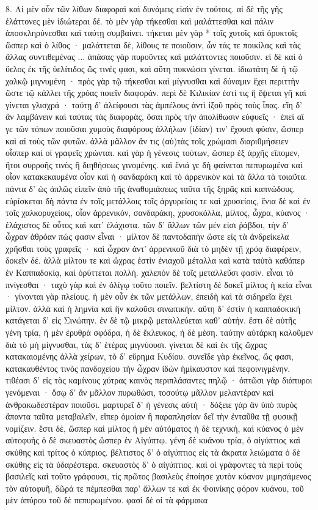 \documentclass[a4paper, 11pt, oneside, polutonikogreek, german]{article}
\begin{document}
8. Αἱ μὲν οὖν τῶν λίθων διαφοραὶ καὶ δυνάμεις εἰσὶν ἐν τούτοις. αἱ δὲ τῆς γῆς ἐλάττονες μὲν ἰδιώτεραι δέ. τὸ μὲν γὰρ τήκεσθαι καὶ μαλάττεσθαι καὶ πάλιν ἀποσκληρύνεσθαι καὶ ταύτῃ συμβαίνει. τήκεται μὲν γὰρ * τοῖς χυτοῖς καὶ ὀρυκτοῖς ὥσπερ καὶ ὁ λίθος · μαλάττεται δὲ, λίθους τε ποιοῦσιν, ὧν τάς τε ποικίλας καὶ τὰς ἄλλας συντιθεμένας ... ἁπάσας γὰρ πυροῦντες καὶ μαλάττοντες ποιοῦσιν. εἰ δὲ καὶ ὁ ὕελος ἐκ τῆς ὑελίτιδος ὥς τινές φασι, καὶ αὕτη πυκνώσει γίνεται. ἰδιωτάτη δὲ ἡ τῷ χαλκῷ μιγνυμένη · πρὸς γὰρ τῷ τήκεσθαι καὶ μίγνυσθαι καὶ δύναμιν ἔχει περιττὴν ὥστε τῷ κάλλει τῆς χρόας ποιεῖν διαφοράν. περὶ δὲ Κιλικίαν ἐστί τις ἣ ἕψεται γῆ καὶ γίνεται γλισχρά · ταύτῃ δ' ἀλείφουσι τὰς ἀμπέλους ἀντὶ ἰξοῦ πρὸς τοὺς ἶπας. εἴη δ' ἂν λαμβάνειν καὶ ταύτας τὰς διαφορὰς, ὅσαι πρὸς τὴν ἀπολίθωσιν εὐφυεῖς · ἐπεὶ αἵ γε τῶν τόπων ποιοῦσαι χυμοὺς διαφόρους ἀλλήλων (ἰδίαν) τιν' ἔχουσι φύσιν, ὥσπερ καὶ αἱ τοὺς τῶν φυτῶν. ἀλλὰ μᾶλλον ἄν τις (αὐ)τὰς τοῖς χρώμασι διαριθμήσειεν οἷσπερ καὶ οἱ γραφεῖς χρώνται. καὶ γὰρ ἡ γένεσις τούτων, ὥσπερ ἐξ ἀρχῆς εἴπομεν, ἤτοι συρροῆς τινὸς ἢ διηθήσεως γινομένης. καὶ ἔνιά γε δὴ φαίνεται πεπυρωμένα καὶ οἷον κατακεκαυμένα οἷον καὶ ἡ σανδαράκη καὶ τὸ ἀρρενικὸν καὶ τὰ ἄλλα τὰ τοιαῦτα. πάντα δ' ὡς ἁπλῶς εἰπεῖν ἀπὸ τῆς ἀναθυμιάσεως ταῦτα τῆς ξηρᾶς καὶ καπνώδους. εὑρίσκεται δὴ πάντα ἐν τοῖς μετάλλοις τοῖς ἀργυρείοις τε καὶ χρυσείοις, ἔνια δὲ καὶ ἐν τοῖς χαλκορυχείοις, οἷον ἀρρενικὸν, σανδαράκη, χρυσοκόλλα, μίλτος, ὦχρα, κύανος · ἐλάχιστος δὲ οὗτος καὶ κατ' ἐλάχιστα. τῶν δ' ἄλλων τῶν μέν εἰσι ῥάβδοι, τὴν δ' ὦχραν ἀθρόαν πώς φασιν εἶναι · μίλτον δὲ παντοδαπὴν ὥστε εἰς τὰ ἀνδρείκελα χρῆσθαι τοὺς γραφεῖς · καὶ ὦχραν ἀντ' ἀρρενικοῦ διὰ τὸ μηδὲν τῇ χρόᾳ διαφέρειν, δοκεῖν δέ. ἀλλὰ μίλτου τε καὶ ὥχρας ἐστὶν ἐνιαχοῦ μέταλλα καὶ κατὰ ταὐτὰ καθάπερ ἐν Καππαδοκίᾳ, καὶ ὀρύττεται πολλή. χαλεπὸν δὲ τοῖς μεταλλεῦσι φασὶν. εἶναι τὸ πνίγεσθαι · ταχὺ γὰρ καὶ ἐν ὀλίγῳ τοῦτο ποιεῖν. βελτίστη δὲ δοκεῖ μίλτος ἡ κεία εἶναι · γίνονται γὰρ πλείους. ἡ μὲν οὖν ἐκ τῶν μετάλλων, ἐπειδὴ καὶ τὰ σιδηρεῖα ἔχει μίλτον. ἀλλὰ καὶ ἡ λημνία καὶ ἣν καλοῦσι σινωπικήν. αὕτη δ' ἐστὶν ἡ καππαδοκικὴ κατάγεται δ' εἰς Σινώπην. ἐν δὲ τῷ μικρῷ μεταλλεύεται καθ' αὑτήν. ἔστι δὲ αὐτῆς γένη τρία, ἡ μὲν ἐρυθρὰ σφόδρα, ἡ δὲ ἔκλευκος, ἡ δὲ μέση. ταύτην αὐτάρκη καλοῦμεν διὰ τὸ μὴ μίγνυσθαι, τὰς δ' ἑτέρας μιγνύουσι. γίνεται δὲ καὶ ἐκ τῆς ὤχρας κατακαιομένης ἀλλὰ χείρων, τὸ δ' εὕρημα Κυδίου. συνεῖδε γὰρ ἐκεῖνος, ὥς φασι, κατακαυθέντος τινὸς πανδοχείου τὴν ὦχραν ἰδὼν ἡμίκαυστον καὶ πεφοινιγμένην. τιθέασι δ' εἰς τὰς καμίνους χύτρας καινὰς περιπλάσαντες πηλῷ · ὀπτῶσι γὰρ διάπυροι γενόμεναι · ὅσῳ δ' ἄν μᾶλλον πυρωθώσι, τοσούτῳ μᾶλλον μελαντέραν καὶ ἀνθρακωδεστέραν ποιοῦσι. μαρτυρεῖ δ' ἡ γένεσις αὐτή · δόξειε γὰρ ἂν ὑπὸ πυρὸς ἅπαντα ταῦτα μεταβαλεῖν, εἴπερ ὁμοίαν ἢ παραπλησίαν δεῖ τὴν ἐνταῦθα τῇ φυσικῇ νομίζειν. ἔστι δὲ, ὥσπερ καὶ μίλτος ἡ μὲν αὐτόματος ἡ δὲ τεχνικὴ, καὶ κύανος ὁ μὲν αὐτοφυὴς ὁ δὲ σκευαστὸς ὥσπερ ἐν Αἰγύπτῳ. γένη δὲ κυάνου τρία, ὁ αἰγύπτιος καὶ σκύθης καὶ τρίτος ὁ κύπριος. βέλτιστος δ' ὁ αἰγύπτιος εἰς τὰ ἄκρατα λειώματα ὁ δὲ σκύθης εἰς τὰ ὑδαρέστερα. σκευαστὸς δ' ὁ αἰγύπτιος. καὶ οἱ γράφοντες τὰ περὶ τοὺς βασιλεῖς καὶ τοῦτο γράφουσι, τίς πρῶτος βασιλεὺς ἐποίησε χυτὸν κύανον μιμησάμενος τὸν αὐτοφυῆ, δῶρά τε πέμπεσθαι παρ' ἄλλων τε καὶ ἐκ Φοινίκης φόρον κυάνου, τοῦ μὲν ἀπύρου τοῦ δὲ πεπυρωμένου. φασὶ δὲ οἱ τὰ φάρμακα 
\end{document}
